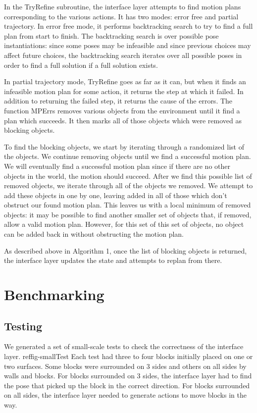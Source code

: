 \documentclass[12pt]{article}
\begin{document}
In the TryRefine subroutine, the interface layer attempts to find motion plans corresponding to the various actions.  
It has two modes: error free and partial trajectory.  
In error free mode, it performs backtracking search to try to find a full plan from start to finish.  
The backtracking search is over possible pose instantiations: since some poses may be infeasible and since previous choices may affect future choices, the backtracking search iterates over all possible poses in order to find a full solution if a full solution exists.  

In partial trajectory mode, TryRefine goes as far as it can, but when it finds an infeasible motion plan for some action, it returns the step at which it failed.  
In addition to returning the failed step, it returns the cause of the errors.  
The function MPErrs removes various objects from the environment until it find a plan which succeeds.  
It then marks all of those objects which were removed as blocking objects.

To find the blocking objects, we start by iterating through a randomized list of the objects.  We continue removing objects until we find a successful motion plan.  
We will eventually find a successful motion plan since if there are no other objects in the world, the motion should succeed.  
After we find this possible list of removed objects, we iterate through all of the objects we removed.  
We attempt to add these objects in one by one, leaving added in all of those which don't obstruct our found motion plan.  
This leaves us with a local minimum of removed objects: it may be possible to find another smaller set of objects that, if removed, allow a valid motion plan.  
However, for this set of this set of objects, no object can be added back in without obstructing the motion plan.

As described above in Algorithm 1, once the list of blocking objects is returned, the interface layer updates the state and attempts to replan from there.


\section{Benchmarking}

\subsection{Testing}
We generated a set of small-scale tests to check the correctness of the interface layer. ref{fig-smallTest} Each test had three to four blocks initially placed on one or two surfaces. Some blocks were surrounded on 3 sides and others on all sides by walls and blocks. For blocks surrounded on 3 sides, the interface layer had to find the pose that picked up the block in the correct direction. For blocks surrounded on all sides, the interface layer needed to generate actions to move blocks in the way.
\end{document}
